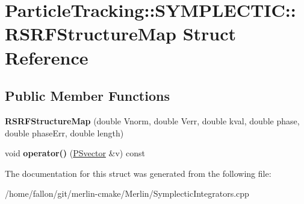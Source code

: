 \hypertarget{structParticleTracking_1_1SYMPLECTIC_1_1RSRFStructureMap}{}\section{Particle\+Tracking\+:\+:S\+Y\+M\+P\+L\+E\+C\+T\+IC\+:\+:R\+S\+R\+F\+Structure\+Map Struct Reference}
\label{structParticleTracking_1_1SYMPLECTIC_1_1RSRFStructureMap}
\subsection*{Public Member Functions}
\begin{DoxyCompactItemize}
\item 
\mbox{\label{structParticleTracking_1_1SYMPLECTIC_1_1RSRFStructureMap_ada35ad44bdbef691c3d12fef991071cf}} 
{\bfseries R\+S\+R\+F\+Structure\+Map} (double Vnorm, double Verr, double kval, double phase, double phase\+Err, double length)
\item 
\mbox{\label{structParticleTracking_1_1SYMPLECTIC_1_1RSRFStructureMap_ab6f83f48b2a7cc7fa41b72175ca6ce9b}} 
void {\bfseries operator()} (\hyperlink{classPSvector}{P\+Svector} \&v) const
\end{DoxyCompactItemize}


The documentation for this struct was generated from the following file\+:\begin{DoxyCompactItemize}
\item 
/home/fallon/git/merlin-\/cmake/\+Merlin/Symplectic\+Integrators.\+cpp\end{DoxyCompactItemize}
